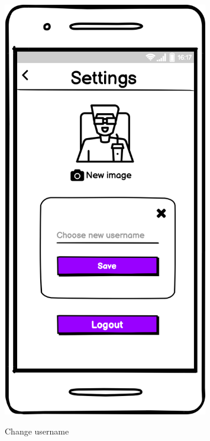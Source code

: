 \documentclass[12pt, a4paper]{article}
\numberwithin{figure}{section}
\begin{document}
\begin{center}
	\begin{minipage}{0.3\textwidth}
		\begin{figure}[H]
			\centering
			\includegraphics[width=0.8\textwidth]{images/mockups/User setting username.png}\\
			\caption{Change username}
		\end{figure}
	\end{minipage}
	\hspace{0.1\linewidth}
	\begin{minipage}{0.3\textwidth}
		\begin{figure}[H]
			\centering

\end{figure}
\end{minipage}
\end{center}
\end{document}
